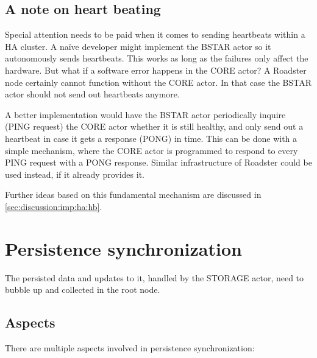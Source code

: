 \subsection{A note on heart beating}\label{sec:approach:ha:hb}
Special attention needs to be paid when it comes to sending heartbeats within a
HA cluster. A na\"ive developer might implement the BSTAR actor so it
autonomously sends heartbeats. This works as long as the failures only affect
the hardware. But what if a software error happens in the CORE actor?  A
Roadster node certainly cannot function without the CORE actor. In that case the
BSTAR actor should not send out heartbeats anymore.

A better implementation would have the BSTAR actor periodically inquire (PING
request) the CORE actor whether it is still healthy, and only send out a
heartbeat in case it gets a response (PONG) in time. This can be done with a
simple mechanism, where the CORE actor is programmed to respond to every PING
request with a PONG response. Similar infrastructure of Roadster could be used
instead, if it already provides it.

Further ideas based on this fundamental mechanism are discussed in
\autoref{sec:discussion:imp:ha:hb}.

\section{Persistence synchronization}\label{sec:approach:psync}
The persisted data and updates to it, handled by the STORAGE actor, need to
bubble up and collected in the root node.

\subsection{Aspects}
There are multiple aspects involved in persistence synchronization:


